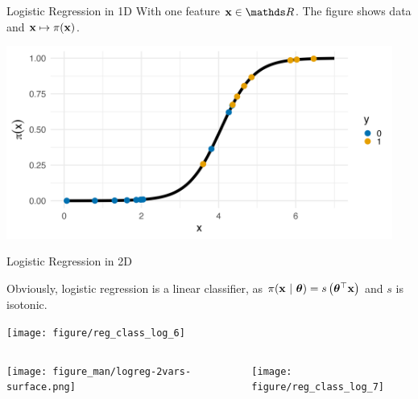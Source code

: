 \documentclass[11pt,compress,t,notes=noshow, xcolor=table]{beamer}
\begin{document}
\begin{vbframe}{Logistic Regression in 1D}
With one feature $\xv \in \R$. The figure shows data and $\mathbf{x} \mapsto \pi(\mathbf{x})$.

\lz

{\centering \includegraphics[width=0.95\textwidth]{figure/preds_with_probs.png}
}

\end{vbframe}
\begin{vbframe}{Logistic Regression in 2D}

Obviously, logistic regression is a linear classifier, as $\pi(\mathbf{x}~|~ \bm{\theta}) = s\left( \bm{\theta}^\top \mathbf{x} \right)$ 
and $s$ is isotonic.

\lz
\begin{knitrout}\scriptsize
{}\color{fgcolor}

{\centering \texttt{[image: figure/reg\_class\_log\_6]}  

}

\end{knitrout}

\framebreak

\begin{columns}[T]
\begin{column}{0.5\textwidth}
  \texttt{[image: figure\_man/logreg-2vars-surface.png]}
\end{column}
\begin{column}{0.5\textwidth}
\begin{knitrout}\scriptsize
{}\color{fgcolor}

{\centering \texttt{[image: figure/reg\_class\_log\_7]} 

}

\end{knitrout}
\end{column}
\end{columns}

\end{vbframe}

\endlecture
\end{document}
